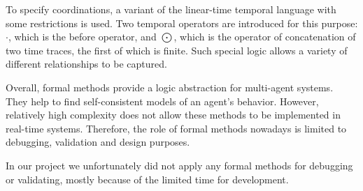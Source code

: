 To specify coordinations, a variant of the linear-time temporal language with some restrictions is used.
Two temporal operators are introduced for this purpose: $\cdot$, which is the before operator, and $\bigodot$, which is the operator of concatenation of two time traces, the first of which is finite.
Such special logic allows a variety of different relationships to be captured.

Overall, formal methods provide a logic abstraction for multi-agent systems.
They help to find self-consistent models of an agent's behavior.
However, relatively high complexity does not allow these methods to be implemented in real-time systems.
Therefore, the role of formal methods nowadays is limited to debugging, validation and design purposes.

In our project we unfortunately did not apply any formal methods for debugging or validating, mostly because of the limited time for development.
